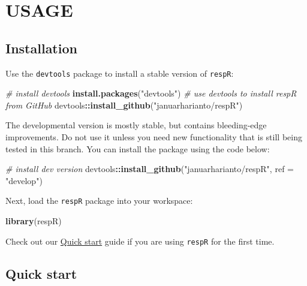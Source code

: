 \documentclass[]{book}
\newenvironment{Shaded}{\begin{snugshade}}{\end{snugshade}}
\newcommand{\KeywordTok}[1]{\textcolor[rgb]{0.13,0.29,0.53}{\textbf{#1}}}
\newcommand{\DataTypeTok}[1]{\textcolor[rgb]{0.13,0.29,0.53}{#1}}
\newcommand{\StringTok}[1]{\textcolor[rgb]{0.31,0.60,0.02}{#1}}
\newcommand{\CommentTok}[1]{\textcolor[rgb]{0.56,0.35,0.01}{\textit{#1}}}
\newcommand{\OperatorTok}[1]{\textcolor[rgb]{0.81,0.36,0.00}{\textbf{#1}}}
\newcommand{\NormalTok}[1]{#1}
\begin{document}
\part*{USAGE}\label{part-usage}

\hypertarget{installation}{\chapter{Installation}\label{installation}}

Use the \texttt{devtools} package to install a stable version of
\texttt{respR}:

\begin{Shaded}
\begin{Highlighting}[]
\CommentTok{# install devtools}
\KeywordTok{install.packages}\NormalTok{(}\StringTok{"devtools"}\NormalTok{)}
\CommentTok{# use devtools to install respR from GitHub}
\NormalTok{devtools}\OperatorTok{::}\KeywordTok{install_github}\NormalTok{(}\StringTok{"januarharianto/respR"}\NormalTok{)}
\end{Highlighting}
\end{Shaded}

The developmental version is mostly stable, but contains bleeding-edge
improvements. Do not use it unless you need new functionality that is
still being tested in this branch. You can install the package using the
code below:

\begin{Shaded}
\begin{Highlighting}[]
\CommentTok{# install dev version}
\NormalTok{devtools}\OperatorTok{::}\KeywordTok{install_github}\NormalTok{(}\StringTok{"januarharianto/respR"}\NormalTok{, }\DataTypeTok{ref =} \StringTok{"develop"}\NormalTok{)}
\end{Highlighting}
\end{Shaded}

Next, load the \texttt{respR} package into your workspace:

\begin{Shaded}
\begin{Highlighting}[]
\KeywordTok{library}\NormalTok{(respR)}
\end{Highlighting}
\end{Shaded}

Check out our \protect\hyperlink{quick-start}{Quick start} guide if you
are using \texttt{respR} for the first time.

\hypertarget{quick-start}{\chapter{Quick start}\label{quick-start}}
\end{document}
